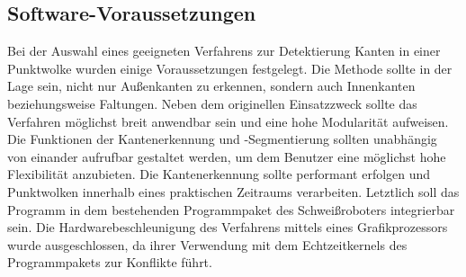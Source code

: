 \subsection{Software-Voraussetzungen}\label{soft_voraus}
Bei der Auswahl eines geeigneten Verfahrens zur Detektierung Kanten in einer Punktwolke wurden einige Voraussetzungen festgelegt. Die Methode sollte in der Lage sein, nicht nur Außenkanten zu erkennen, sondern auch Innenkanten beziehungsweise Faltungen. Neben dem originellen Einsatzzweck sollte das Verfahren möglichst breit anwendbar sein und eine hohe Modularität aufweisen. Die Funktionen der Kantenerkennung und -Segmentierung sollten unabhängig von einander aufrufbar gestaltet werden, um dem Benutzer eine möglichst hohe Flexibilität anzubieten. Die Kantenerkennung sollte performant erfolgen und Punktwolken innerhalb eines praktischen Zeitraums verarbeiten. Letztlich soll das Programm in dem bestehenden Programmpaket des Schweißroboters integrierbar sein. Die Hardwarebeschleunigung des Verfahrens mittels eines Grafikprozessors wurde ausgeschlossen, da ihrer Verwendung mit dem Echtzeitkernels des Programmpakets zur Konflikte führt. 


